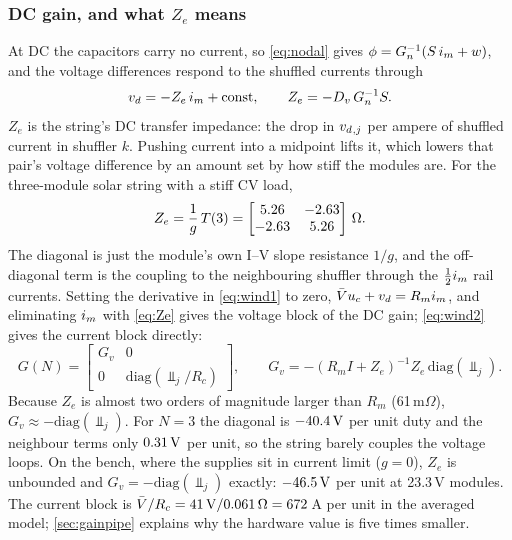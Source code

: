 \subsubsection*{DC gain, and what $Z_e$ means}
At DC the capacitors carry no current, so \cref{eq:nodal} gives $\phi = G_n^{-1}(S\,\im + w)$, and the voltage differences respond to the shuffled currents through
\begin{equation}
  \vd = -Z_e\,\im + \text{const}, \qquad Z_e = -D_v\,G_n^{-1}S. \label{eq:Ze}
\end{equation}
$Z_e$ is the string's DC transfer impedance: the drop in $\vd{}_{,j}$ per ampere of shuffled current in shuffler $k$. Pushing current into a midpoint lifts it, which lowers that pair's voltage difference by an amount set by how stiff the modules are. For the three-module solar string with a stiff CV load,
\begin{equation*}
  Z_e = \frac{1}{g}\,T(3) = \begin{bmatrix} 5.26 & -2.63\\ -2.63 & 5.26\end{bmatrix}\ohm.
\end{equation*}
The diagonal is just the module's own I--V slope resistance $1/g$, and the off-diagonal term is the coupling to the neighbouring shuffler through the $\tfrac12\im$ rail currents. Setting the derivative in \cref{eq:wind1} to zero, $\Vbar\uc + \vd = R_m\im$, and eliminating $\im$ with \cref{eq:Ze} gives the voltage block of the DC gain; \cref{eq:wind2} gives the current block directly:
\begin{equation}
  G(N) = \begin{bmatrix} G_v & 0\\ 0 & \mathrm{diag}(\Vbar_j/R_c)\end{bmatrix},\qquad G_v = -(R_m I + Z_e)^{-1} Z_e\,\mathrm{diag}(\Vbar_j). \label{eq:G}
\end{equation}
Because $Z_e$ is almost two orders of magnitude larger than $R_m$ (61\,m$\Omega$), $G_v \approx -\mathrm{diag}(\Vbar_j)$. For $N = 3$ the diagonal is $-40.4\V$ per unit duty and the neighbour terms only $0.31\V$ per unit, so the string barely couples the voltage loops. On the bench, where the supplies sit in current limit ($g = 0$), $Z_e$ is unbounded and $G_v = -\mathrm{diag}(\Vbar_j)$ exactly: $-46.5\V$ per unit at 23.3\,V modules. The current block is $\Vbar/R_c = 41\V / 0.061\ohm = 672$\,A per unit in the averaged model; \cref{sec:gainpipe} explains why the hardware value is five times smaller.


